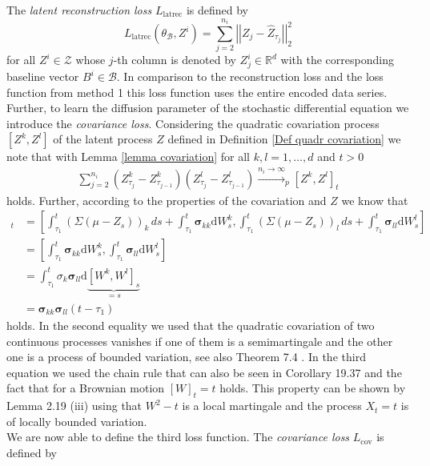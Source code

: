 \documentclass[11pt,titlepage]{article}
\newcommand{\R}{\mathbb{R}} %
\newcommand{\abs}[1]{{\left| #1 \right|}}
\theoremstyle{definition}
\theoremstyle{remark}
\begin{document}
	The \textsl{latent reconstruction loss} $L_\mathrm{latrec}$ is defined by
	\[L_\mathrm{latrec}(\theta_\mathcal{B}, Z^i) = \sum_{j=2}^{n_i}\abs{\abs{Z_j - \hat{Z}_{\tau_j}}}^2_2\]
	for all $Z^i\in\mathcal{Z}$ whose $j$-th column is denoted by $Z^i_j\in\R^{d}$ with the  corresponding baseline vector $B^i\in\mathcal{B}$. In comparison to the reconstruction loss and the loss function from method 1 this loss function uses the entire encoded data series.\\ 
	Further, to learn the diffusion parameter of the stochastic differential equation we introduce the \textsl{covariance loss}. 
	Considering the quadratic covariation process $[Z^k, Z^l]$ of the latent process $Z$ defined in Definition \ref{Def quadr covariation} we note that with Lemma \ref{lemma covariation} for all $k,l=1,\ldots,d$ and $t>0$
	\begin{align*}
		\sum\limits_{j=2}^{n_i} (Z^k_{\tau_j}-Z^k_{\tau_{j-1}})(Z^l_{\tau_{j}}-Z^l_{\tau_{j-1}}) \xrightarrow{n_i \rightarrow \infty}_p [Z^k,Z^l]_t
	\end{align*}
	holds. Further, according to the properties of the covariation and $Z$ we know that
	\begin{align*}
		[Z^k,Z^l]_t &= \left[ \int_{\tau_1}^t (\Sigma(\mu - Z_s))_k \, ds + \int_{\tau_1}^t \boldsymbol{\sigma}_{kk} \mathrm{d}W_s^k, \int_{\tau_1}^t (\Sigma(\mu - Z_s))_l \, ds + \int_{\tau_1}^t \boldsymbol{\sigma}_{ll} \mathrm{d}W_s^l \right]\\
		&= \left[ \int_{\tau_1}^t \boldsymbol{\sigma}_{kk} \mathrm{d}W_s^k, \int_{\tau_1}^t \boldsymbol{\sigma}_{ll} \mathrm{d}W_s^l \right]\\
		&=\int_{\tau_1}^t \sigma_k \boldsymbol{\sigma}_{ll} \mathrm{d}\underbrace{[W^k,W^l]_s}_{=s}\\
		&= \boldsymbol{\sigma}_{kk} \boldsymbol{\sigma}_{ll} (t-\tau_1)
	\end{align*}
	holds. 
	In the second equality we used that the quadratic covariation of two continuous processes vanishes if one of them is a semimartingale and the other one is a process of bounded variation, see also Theorem 7.4 \cite{StoProSchmidt2021}. In the third equation we used the chain rule that can also be seen in Corollary 19.37 \cite{Pfaffelhuber2020} and the fact that for a Brownian motion $[W]_t=t$ holds. This property can be shown by Lemma 2.19 (iii) \cite{Schmidt2021Fima} using that $W^2 -t$ is a local martingale and the process $X_t = t$ is of locally bounded variation. \\
	We are now able to define the third loss function. The \textsl{covariance loss} $L_\mathrm{cov}$ is defined by
\end{document}
